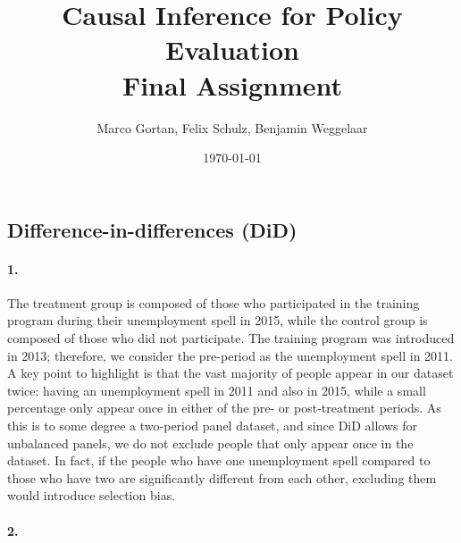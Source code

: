 \documentclass{scrartcl}
\title{Causal Inference for Policy Evaluation\\
\Large{Final Assignment}}
\author{Marco Gortan, Felix Schulz, Benjamin Weggelaar}
\date{\today}
\begin{document}
\maketitle



\subsection*{Difference-in-differences (DiD)}

\paragraph*{1.}
The treatment group is composed of those who participated in the training program during their unemployment spell in 2015, while the control group is composed of those who did not participate. The training program was introduced in 2013; therefore, we consider the pre-period as the unemployment spell in 2011. \\

A key point to highlight is that the vast majority of people appear in our dataset twice: having an unemployment spell in 2011 and also in 2015, while a small percentage only appear once in either of the pre- or post-treatment periods. As this is to some degree a two-period panel dataset, and since DiD allows for unbalanced panels, we do not exclude people that only appear once in the dataset. In fact, if the people who have one unemployment spell compared to those who have two are significantly different from each other, excluding them would introduce selection bias. 

\paragraph*{2.}

 

\end{document}
